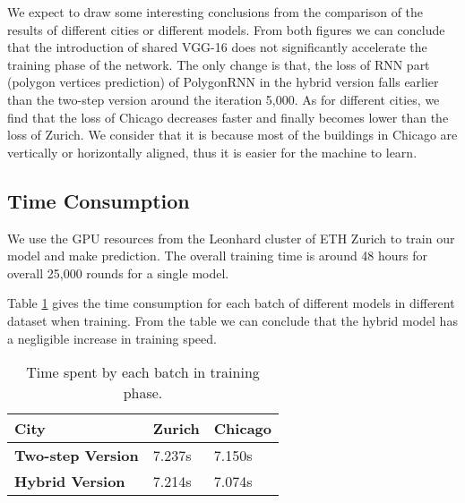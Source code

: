 We expect to draw some interesting conclusions from the comparison of the results of different cities or different models. From both figures we can conclude that the introduction of shared VGG-16 does not significantly accelerate the training phase of the network. The only change is that, the loss of RNN part (polygon vertices prediction) of PolygonRNN in the hybrid version falls earlier than the two-step version around the iteration 5,000. As for different cities, we find that the loss of Chicago decreases faster and finally becomes lower than the loss of Zurich. We consider that it is because most of the buildings in Chicago are vertically or horizontally aligned, thus it is easier for the machine to learn.




\subsection{Time Consumption}\label{tmcsmp}
We use the GPU resources from the Leonhard cluster of ETH Zurich to train our model and make prediction. The overall training time is around 48 hours for overall 25,000 rounds for a single model.

Table \ref{tab:timetrain} gives the time consumption for each batch of different models in different dataset when training. From the table we can conclude that the hybrid model has a negligible increase in training speed.
\begin{table}[!h]
	\centering
	\caption[Time spent by each batch in training phase]{Time spent by each batch in training phase.}
	\label{tab:timetrain}
	\begin{tabular}{l|l l}
	\hline
	\textbf{City} & Zurich & Chicago \\
	\hline
	\textbf{Two-step Version} & 7.237s & 7.150s \\
	\textbf{Hybrid Version} & 7.214s & 7.074s \\
	\hline
	\end{tabular}
\end{table}

